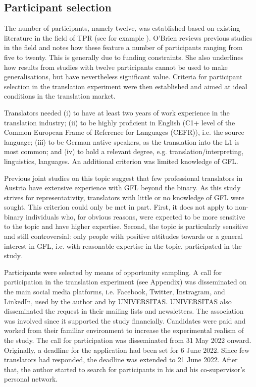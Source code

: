 \subsection{Participant selection} \label{sec:participants}
The number of participants, namely twelve, was established based on existing literature in the field of TPR (see for example \cite[255]{o2009eye}). O'Brien reviews previous studies in the field and notes how these feature a number of participants ranging from five to twenty. This is generally due to funding constraints. She also underlines how results from studies with twelve participants cannot be used to make generalisations, but have nevertheless significant value. Criteria for participant selection in the translation experiment were then established and aimed at ideal conditions in the translation market.

Translators needed (i) to have at least two years of work experience in the translation industry; (ii) to be highly proficient in English (C1+ level of the Common European Frame of Reference for Languages (CEFR)), i.e. the source language; (iii) to be German native speakers, as the translation into the L1 is most common; and (iv) to hold a relevant degree, e.g. translation/interpreting, linguistics, languages. An additional criterion was limited knowledge of GFL.

Previous joint studies on this topic \citep{burtscher-2022-genderfairmt,gromann2023participatory} suggest that few professional translators in Austria have extensive experience with GFL beyond the binary. As this study strives for representativity, translators with little or no knowledge of GFL were sought. This criterion could only be met in part. First, it does not apply to non-binary individuals who, for obvious reasons, were expected to be more sensitive to the topic and have higher expertise. Second, the topic is particularly sensitive and still controversial: only people with positive attitudes towards or a general interest in GFL, i.e. with reasonable expertise in the topic, participated in the study. %

Participants were selected by means of opportunity sampling. A call for participation in the translation experiment (see Appendix) was disseminated on the main social media platforms, i.e. Facebook, Twitter, Instragram, and LinkedIn, used by the author and by UNIVERSITAS. UNIVERSITAS also disseminated the request in their mailing lists and newsletters. The association was involved since it supported the study financially. Candidates were paid and worked from their familiar environment to increase the experimental realism of the study. The call for participation was disseminated from 31 May 2022 onward. Originally, a deadline for the application had been set for 6 June 2022. Since few translators had responded, the deadline was extended to 21 June 2022. After that, the author started to search for participants in his and his co-supervisor's personal network. 

